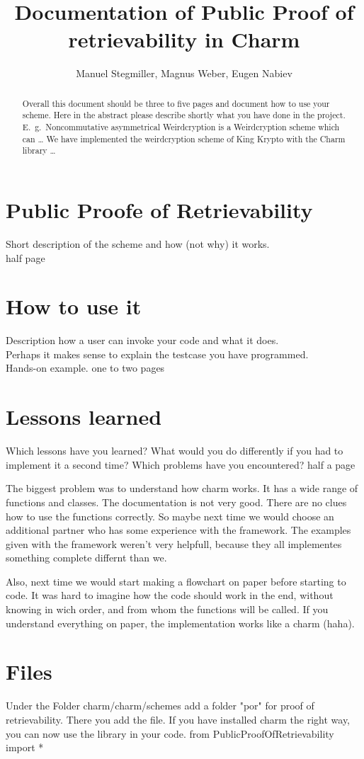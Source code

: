 \documentclass{amsart}
\title{Documentation of Public Proof of retrievability in Charm}
\author{Manuel Stegmiller, Magnus Weber, Eugen Nabiev}
\begin{document}
\begin{abstract}
Overall this document should be three to five pages and document how
to use your scheme.
Here in the abstract please describe shortly what you have done in the
project. E.\ g.\ Noncommutative asymmetrical Weirdcryption is a
Weirdcryption scheme which can \ldots
We have implemented the weirdcryption scheme of King Krypto with the
Charm library \ldots
\end{abstract}
\maketitle
\section{Public Proofe of Retrievability}
Short description of the scheme and how (not why) it works.\\
half page

\section{How to use it}
Description how a user can invoke your code and what it does.\\
Perhaps it makes sense to explain the testcase you have programmed.\\
Hands-on example.
one to two pages

\section{Lessons learned}
Which lessons have you learned? What would you do differently if you
had to implement it a second time? Which problems have you
encountered?
half a page

The biggest problem was to understand how charm works. It has a wide range of functions and classes. The documentation is not very good. There are no clues how to use the functions correctly. So maybe next time we would choose an additional partner who has some experience with the framework. The examples given with the framework weren't very helpfull, because they all implementes something complete differnt than we.

Also, next time we would start making a flowchart on paper before starting to code. It was hard to imagine how the code should work in the end, without knowing in wich order, and from whom the functions will be called. If you understand everything on paper, the implementation works like a charm (haha).

\section{Files}
Under the Folder charm/charm/schemes add a folder "por" for proof of retrievability. There you add the file. If you have installed charm the right way, you can now use the library in your code.
from PublicProofOfRetrievability import *
\end{document}

